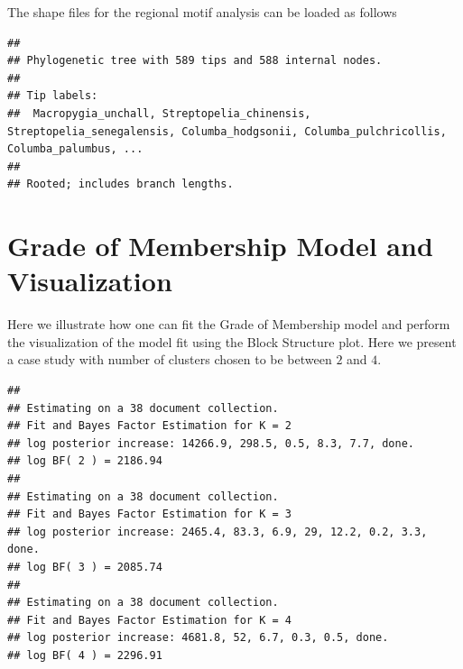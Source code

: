 \documentclass[12pt]{article}
\begin{document}
The shape files for the regional motif analysis can be loaded as follows

\begin{knitrout}
\color{fgcolor}\begin{kframe}
\begin{alltt}
 \hlkwb{<-} \hlopt{::}\hlstd{(}\hlstd{(}\hlstd{,} \hlstd{,}
                              \hlstd{=} \hlstd{))}
\end{alltt}
\begin{verbatim}
## 
## Phylogenetic tree with 589 tips and 588 internal nodes.
## 
## Tip labels:
## 	Macropygia_unchall, Streptopelia_chinensis, Streptopelia_senegalensis, Columba_hodgsonii, Columba_pulchricollis, Columba_palumbus, ...
## 
## Rooted; includes branch lengths.
\end{verbatim}
\end{kframe}
\end{knitrout}

\section{Grade of Membership Model and Visualization}

Here we illustrate how one can fit the Grade of Membership model and perform the visualization of the model fit using the Block Structure plot. Here we present a case study with number of clusters chosen to be between $2$ and $4$.

\begin{knitrout}
\color{fgcolor}\begin{kframe}
\begin{alltt}
\hlkwb{=}\hlopt{$}
 \hlkwb{=} \hlopt{$}
 \hlkwb{<-} \hlopt{::}\hlstd{(} \hlstd{=}\hlopt{:}\hlstd{,} \hlstd{=}\hlstd{)}
\end{alltt}
\begin{verbatim}
## 
## Estimating on a 38 document collection.
## Fit and Bayes Factor Estimation for K = 2
## log posterior increase: 14266.9, 298.5, 0.5, 8.3, 7.7, done.
## log BF( 2 ) = 2186.94
## 
## Estimating on a 38 document collection.
## Fit and Bayes Factor Estimation for K = 3
## log posterior increase: 2465.4, 83.3, 6.9, 29, 12.2, 0.2, 3.3, done.
## log BF( 3 ) = 2085.74
## 
## Estimating on a 38 document collection.
## Fit and Bayes Factor Estimation for K = 4
## log posterior increase: 4681.8, 52, 6.7, 0.3, 0.5, done.
## log BF( 4 ) = 2296.91
\end{verbatim}
\end{kframe}
\end{knitrout}
\end{document}
